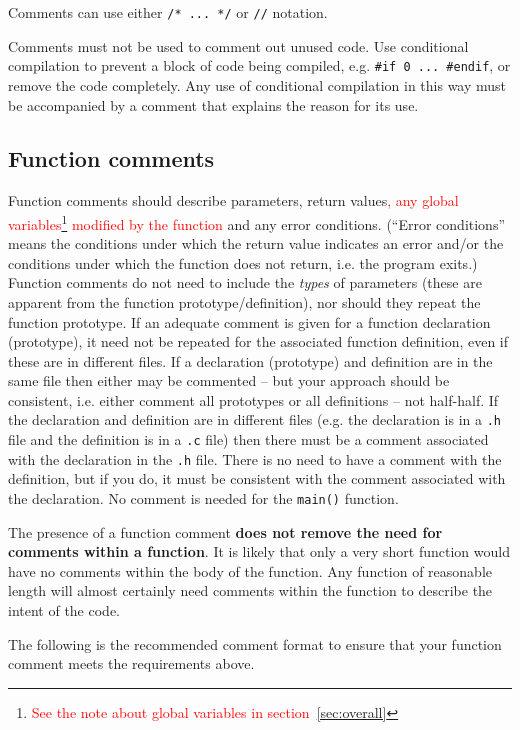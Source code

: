\documentclass{article}
\begin{document}
Comments can use either \texttt{/* ... */} or \texttt{//} notation.

Comments must not be used to comment out unused code. Use conditional compilation to prevent a block of
code being compiled, e.g. \texttt{\#if 0 ... \#endif}, or remove the code completely. Any use of conditional compilation in
this way must be accompanied by a comment that explains the reason for its use.

\subsection{Function comments}
Function comments should describe parameters, return values\textcolor{red}{, any global variables\footnote{\textcolor{red}{See the note about global variables in section~\ref{sec:overall}}} modified by the function} and any error conditions. (``Error conditions'' means
the conditions under which the return value indicates an error and/or the conditions under which the 
function does not return, i.e. the program exits.)
Function comments do not need to include the \textit{types} of parameters (these are apparent from the function prototype/definition), 
nor should they repeat the function prototype. If an adequate comment is given for a function 
declaration (prototype), it need not be repeated for the associated function definition, even if these are in 
different files. If a declaration (prototype) and
definition are in the same file then either may be commented -- but your approach should be consistent, i.e. either comment
all prototypes or all definitions -- not half-half. If the declaration and definition are in different files
(e.g. the declaration is in a \texttt{.h} file and the definition is in a \texttt{.c} file) then there must be a comment
associated with the declaration in the \texttt{.h} file. There is no need to have a comment with the definition, 
but if you do, it must be consistent with the comment associated with the declaration.
No comment is needed for the \texttt{main()} function.

The presence of a function comment \textbf{does not remove the need for comments within a function}. It is likely that only a very short
function would have no comments within the body of the function. Any function of reasonable length will almost certainly need
comments within the function to describe the intent of the code.

The following is the recommended comment format to ensure that your function comment meets the requirements above.
\end{document}
